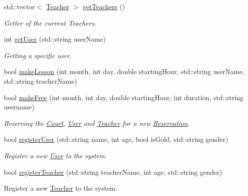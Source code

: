 \begin{DoxyCompactItemize}
std\+::vector$<$ \mbox{\hyperlink{class_teacher}{Teacher}} $>$ \mbox{\hyperlink{class_company_a000159ce012318a6edf0335447ad8bde}{get\+Teachers}} ()
\begin{DoxyCompactList}\small\item\em Getter of the current Teachers. \end{DoxyCompactList}\item 
int \mbox{\hyperlink{class_company_ad3fc4daf4b94e0156f05049eab8ff52d}{get\+User}} (std\+::string user\+Name)
\begin{DoxyCompactList}\small\item\em Getting a specific user. \end{DoxyCompactList}\item 
bool \mbox{\hyperlink{class_company_a0ab3ff0ea443cc20fd1ea99e5d8725c9}{make\+Lesson}} (int month, int day, double starting\+Hour, std\+::string user\+Name, std\+::string teacher\+Name)
\item 
bool \mbox{\hyperlink{class_company_a56fa75dd66690eae0853a3f3278220e3}{make\+Free}} (int month, int day, double starting\+Hour, int duration, std\+::string username)
\begin{DoxyCompactList}\small\item\em Reserving the \mbox{\hyperlink{class_court}{Court}}, \mbox{\hyperlink{class_user}{User}} and \mbox{\hyperlink{class_teacher}{Teacher}} for a new \mbox{\hyperlink{class_reservation}{Reservation}}. \end{DoxyCompactList}\item 
bool \mbox{\hyperlink{class_company_a94383e957bfa622949f1e577a325a1d5}{register\+User}} (std\+::string name, int age, bool is\+Gold, std\+::string gender)
\begin{DoxyCompactList}\small\item\em Register a new \mbox{\hyperlink{class_user}{User}} to the system. \end{DoxyCompactList}\item 
bool \mbox{\hyperlink{class_company_afd7f0c326672c6bb6a23d5921503bc0d}{register\+Teacher}} (std\+::string teacher\+Name, int age, std\+::string gender)
\begin{DoxyCompactList}\small\item\em 
\begin{DoxyItemize}
\item Register a new \mbox{\hyperlink{class_teacher}{Teacher}} to the system. 
\end{DoxyItemize}\end{DoxyCompactList}\item 

\end{DoxyCompactItemize}
